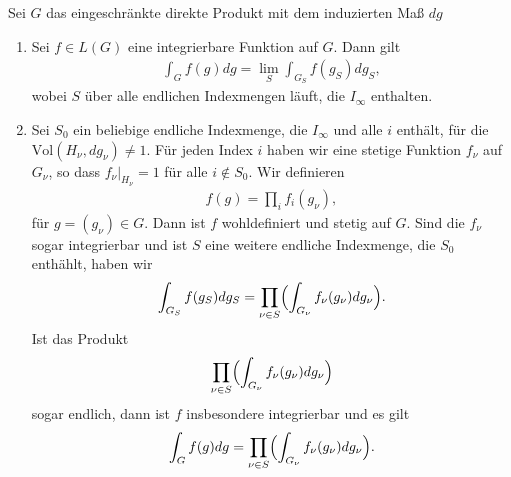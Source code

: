 		\begin{proposition}\label{prop:integrieren}
			Sei $G$ das eingeschränkte direkte Produkt mit dem induzierten Maß $dg$
			\begin{enumerate}[label=\emph{(\roman*)}]
				\item Sei $f \in L(G)$ eine integrierbare Funktion auf $G$. Dann gilt
					\begin{align*}
						\int_G f(g)dg = \lim_S \int_{G_S} f(g_S) dg_S,
					\end{align*}
					wobei $S$ über alle endlichen Indexmengen läuft, die $I_\infty$ enthalten.
				\item Sei $S_0$ ein beliebige endliche Indexmenge, die $I_\infty$ und alle $i$ enthält, für die $\text{Vol}(H_\nu, dg_\nu) \not= 1$. 
					Für jeden Index $i$ haben wir eine stetige Funktion $f_\nu$ auf $G_\nu$, so dass $f_\nu |_{H_\nu} = 1$ für alle $i \notin S_0$. 
					Wir definieren
					\begin{align*}
						f(g) = \prod_{i}f_{i}(g_\nu),
					\end{align*}
					für $g=(g_\nu) \in G$. 
					Dann ist $f$ wohldefiniert und stetig auf $G$. 
					Sind die $f_\nu$ sogar integrierbar und ist $S$ eine weitere endliche Indexmenge, die $S_0$ enthählt, haben wir
					\begin{align}\label{eq:satz:integration}
						\int_{G_S} f(g_S) dg_S = \prod_{\nu\in S}\Bigl(\int_{G_\nu} f_\nu (g_\nu)dg_\nu\Bigr).
					\end{align}
					Ist das Produkt
					\begin{align*}
						\prod_{\nu\in S}\Bigl(\int_{G_\nu} f_\nu (g_\nu)dg_\nu\Bigr)
					\end{align*}
					sogar endlich, dann ist $f$ insbesondere integrierbar und es gilt
					\begin{align*}
						\int_{G} f(g) dg = \prod_{\nu\in S}\Bigl(\int_{G_\nu} f_\nu (g_\nu)dg_\nu\Bigr).
					\end{align*}	
			\end{enumerate}
		\end{proposition}
